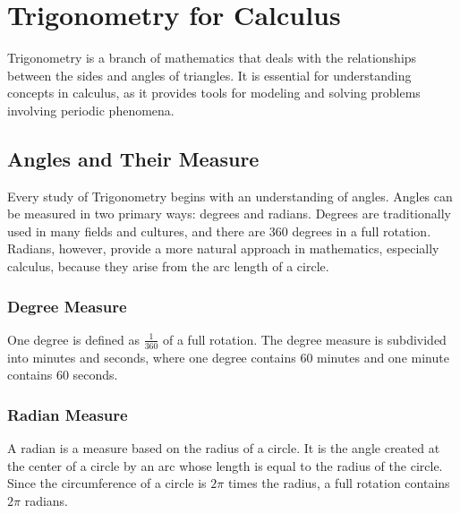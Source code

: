 \documentclass[a4paper,12pt]{book}
\newcounter{problem}
\begin{document}
\chapter{Trigonometry for Calculus}
\label{chap:trigonometry}

Trigonometry is a branch of mathematics that deals with the relationships between the sides and angles of triangles. It is essential for understanding concepts in calculus, as it provides tools for modeling and solving problems involving periodic phenomena.


\section{Angles and Their Measure}
\label{sec:angles_measure}

Every study of Trigonometry begins with an understanding of angles. Angles can be measured in two primary ways: degrees and radians. Degrees are traditionally used in many fields and cultures, and there are \(360\) degrees in a full rotation. Radians, however, provide a more natural approach in mathematics, especially calculus, because they arise from the arc length of a circle.

\subsection{Degree Measure}
\label{subsec:degree_measure}

One degree is defined as \(\frac{1}{360}\) of a full rotation. The degree measure is subdivided into minutes and seconds, where one degree contains \(60\) minutes and one minute contains \(60\) seconds.

\subsection{Radian Measure}
\label{subsec:radian_measure}

A radian is a measure based on the radius of a circle. It is the angle created at the center of a circle by an arc whose length is equal to the radius of the circle. Since the circumference of a circle is \(2\pi\) times the radius, a full rotation contains \(2\pi\) radians.
\end{document}
